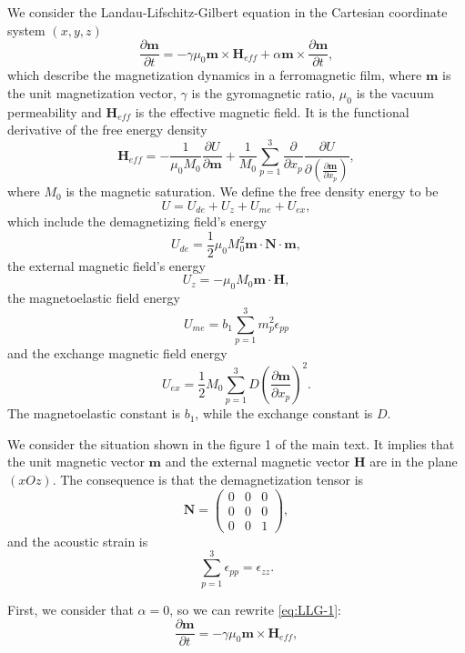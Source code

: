 \documentclass[aps,prl,amsmath,amssymb,preprint,superscriptaddress]{revtex4-1}
\begin{document}
We consider the Landau-Lifschitz-Gilbert equation in the Cartesian coordinate system $\left(x,y,z\right)$
\begin{equation}
    \frac{\partial \mathbf{m}}{\partial t} = - \gamma \mu_0 \mathbf{m} \times \mathbf{H}_{eff} + \alpha \mathbf{m} \times \frac{\partial \mathbf{m}}{\partial t},
    \label{eq:LLG-1}
\end{equation}
which describe the magnetization dynamics in a ferromagnetic film, where $\mathbf{m}$ is the unit magnetization vector, $\gamma$ is the gyromagnetic ratio, $\mu_0$ is the vacuum permeability and $\mathbf{H}_{eff}$ is the effective magnetic field.
It is the functional derivative of the free energy density
\begin{equation}
    \mathbf{H}_{eff} = - \frac{1}{\mu_0 M_0} \frac{\partial U}{\partial \mathbf{m}} + \frac{1}{M_0} \sum_{p=1}^{3} \frac{\partial}{\partial x_p} \frac{\partial U}{\partial \left(\frac{\partial  \mathbf{m}}{\partial x_p} \right)},
    \label{eq:Heff}
\end{equation}
where $M_0$ is the magnetic saturation.
We define the free density energy to be 
\begin{equation}
    U = U_{de} + U_{z} + U_{me} + U_{ex},
    \label{eq:U}
\end{equation}
which include the demagnetizing field's energy
\begin{equation}
    U_{de} = \frac{1}{2} \mu_0 M_0^2 \mathbf{m} \cdot \mathbf{N} \cdot \mathbf{m},
    \label{eq:Ude}
\end{equation}
the external magnetic field's energy
\begin{equation}
    U_z = -\mu_0 M_0 \mathbf{m} \cdot \mathbf{H},
    \label{eq:Uz}
\end{equation}
the magnetoelastic field energy
\begin{equation}
    U_{me} = b_1 \sum_{p=1}^3 m_p^2\epsilon_{pp}
    \label{eq:Ume}
\end{equation}
and the exchange magnetic field energy
\begin{equation}
    U_{ex} = \frac{1}{2} M_0 \sum_{p=1}^3 D \left( \frac{\partial \mathbf{m}}{\partial x_p} \right)^2.
    \label{eq:Uex}
\end{equation}
The magnetoelastic constant is $b_1$, while the exchange constant is $D$.

We consider the situation shown in the figure 1 of the main text.
It implies that the unit magnetic vector $\mathbf{m}$ and the external magnetic vector $\mathbf{H}$ are in the plane $\left(x O z\right)$.
The consequence is that the demagnetization tensor is
\begin{equation}
    \mathbf{N} = \begin{pmatrix} 0 & 0 & 0 \\
    0 & 0 & 0 \\
    0 & 0 & 1
    \end{pmatrix},
    \label{eq:N}
\end{equation}
and the acoustic strain is
\begin{equation}
    \sum_{p=1}^3\epsilon_{pp} = \epsilon_{zz}.
    \label{eq:epsilon}
\end{equation}


First, we consider that $\alpha = 0$, so we can rewrite \ref{eq:LLG-1}:
\begin{equation}
    \frac{\partial \mathbf{m}}{\partial t} = - \gamma \mu_0 \mathbf{m} \times \mathbf{H}_{eff},
    \label{eq:LLG-2}
\end{equation}
%
\end{document}
